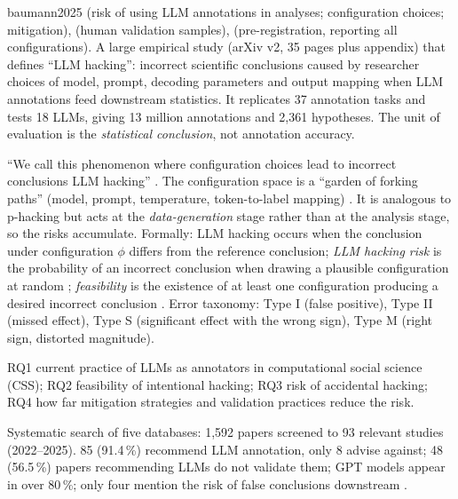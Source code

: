 \begin{papercard}{baumann2025}
  (risk of using LLM annotations in analyses; configuration choices; mitigation),  (human validation samples),  (pre-registration, reporting all configurations). A large empirical study (arXiv v2, 35 pages plus appendix) that defines ``LLM hacking'': incorrect scientific conclusions caused by researcher choices of model, prompt, decoding parameters and output mapping when LLM annotations feed downstream statistics. It replicates 37 annotation tasks and tests 18 LLMs, giving 13 million annotations and 2,361 hypotheses. The unit of evaluation is the \emph{statistical conclusion}, not annotation accuracy.

 ``We call this phenomenon where configuration choices lead to incorrect conclusions LLM hacking'' . The configuration space is a ``garden of forking paths'' (model, prompt, temperature, token-to-label mapping) . It is analogous to p-hacking but acts at the \emph{data-generation} stage rather than at the analysis stage, so the risks accumulate. Formally: LLM hacking occurs when the conclusion under configuration $\phi$ differs from the reference conclusion; \emph{LLM hacking risk} is the probability of an incorrect conclusion when drawing a plausible configuration at random ; \emph{feasibility} is the existence of at least one configuration producing a desired incorrect conclusion . Error taxonomy: Type I (false positive), Type II (missed effect), Type S (significant effect with the wrong sign), Type M (right sign, distorted magnitude).

 RQ1 current practice of LLMs as annotators in computational social science (CSS); RQ2 feasibility of intentional hacking; RQ3 risk of accidental hacking; RQ4 how far mitigation strategies and validation practices reduce the risk.

 Systematic search of five databases: 1,592 papers screened to 93 relevant studies (2022--2025). 85 (91.4\,\%) recommend LLM annotation, only 8 advise against; 48 (56.5\,\%) papers recommending LLMs do not validate them; GPT models appear in over 80\,\%; only four mention the risk of false conclusions downstream .


\end{papercard}
